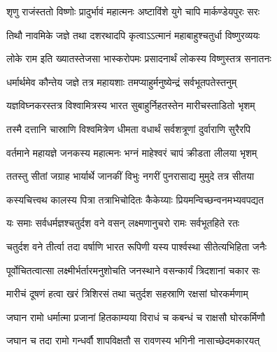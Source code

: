 

\translink{}

\storymeta



\twolineshloka
{शृणु राजंस्ततो विष्णोः प्रादुर्भावं महात्मनः}
{अष्टाविंशे युगे चापि मार्कण्डेयपुरः सरः}


\twolineshloka
{तिथौ नावमिके जज्ञे तथा दशरथादपि}
{कृत्वाऽऽत्मानं महाबाहुश्चतुर्धा विष्णुरव्ययः}


\twolineshloka
{लोके राम इति ख्यातस्तेजसा भास्करोपमः}
{प्रसादनार्थं लोकस्य विष्णुस्तत्र सनातनः}


\twolineshloka
{धर्मार्थमेव कौन्तेय जज्ञे तत्र महायशाः}
{तमप्याहुर्मनुष्येन्द्रं सर्वभूतपतेस्तनुम्}


\twolineshloka
{यज्ञविघ्नकरस्तत्र विश्वामित्रस्य भारत}
{सुबाहुर्निहतस्तेन मारीचस्ताडितो भृशम्}


\twolineshloka
{तस्मै दत्तानि चास्राणि विश्वमित्रेण धीमता}
{वधार्थं सर्वशत्रूणां दुर्वाराणि सुरैरपि}


\twolineshloka
{वर्तमाने महायज्ञे जनकस्य महात्मनः}
{भग्नं माहेश्वरं चापं क्रीडता लीलया भृशम्}


\twolineshloka
{ततस्तु सीतां जग्राह भार्यार्थे जानकीं विभुः}
{नगरीं पुनरासाद्य मुमुदे तत्र सीतया}


\twolineshloka
{कस्यचित्त्वथ कालस्य पित्रा तत्राभिचोदितः}
{कैकेय्याः प्रियमन्विच्छन्वनमभ्यवपद्यत}


\twolineshloka
{यः समाः सर्वधर्मज्ञश्चतुर्दश वने वसन्}
{लक्ष्मणानुचरो रामः सर्वभूतहिते रतः}


\twolineshloka
{चतुर्दश वने तीर्त्वा तदा वर्षाणि भारत}
{रूपिणी यस्य पार्श्वस्था सीतेत्यभिहिता जनैः}


\twolineshloka
{पूर्वोचितत्वात्सा लक्ष्मीर्भर्तारमनुशोचति}
{जनस्थाने वसन्कार्यं त्रिदशानां चकार सः}


\twolineshloka
{मारीचं दूषणं हत्वा खरं त्रिशिरसं तथा}
{चतुर्दश सहस्राणि रक्षसां घोरकर्मणाम्}


\twolineshloka
{जघान रामो धर्मात्मा प्रजानां हितकाम्यया}
{विराधं च कबन्धं च राक्षसौ घोरकर्मिणौ}


\twolineshloka
{जघान च तदा रामो गन्धर्वौ शापविक्षतौ}
{स रावणस्य भगिनी नासाच्छेदमकारयत्}


